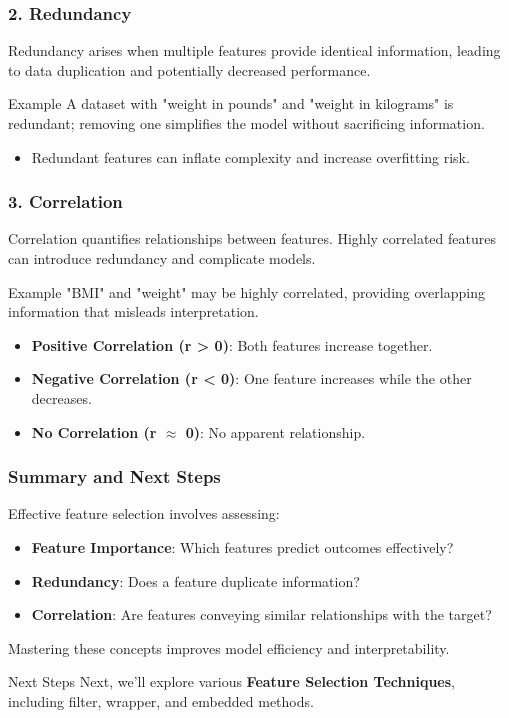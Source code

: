 \documentclass{beamer}
\begin{document}
\begin{frame}[fragile]
    \frametitle{2. Redundancy}
    Redundancy arises when multiple features provide identical information, leading to data duplication and potentially decreased performance.

    \begin{block}{Example}
        A dataset with "weight in pounds" and "weight in kilograms" is redundant; removing one simplifies the model without sacrificing information.
    \end{block}

    \begin{itemize}
        \item Redundant features can inflate complexity and increase overfitting risk.
    \end{itemize}
\end{frame}

\begin{frame}[fragile]
    \frametitle{3. Correlation}
    Correlation quantifies relationships between features. Highly correlated features can introduce redundancy and complicate models.

    \begin{block}{Example}
        "BMI" and "weight" may be highly correlated, providing overlapping information that misleads interpretation.
    \end{block}

    \begin{itemize}
        \item \textbf{Positive Correlation (r > 0)}: Both features increase together.
        \item \textbf{Negative Correlation (r < 0)}: One feature increases while the other decreases.
        \item \textbf{No Correlation (r $\approx$ 0)}: No apparent relationship.
    \end{itemize}
\end{frame}

\begin{frame}[fragile]
    \frametitle{Summary and Next Steps}
    Effective feature selection involves assessing:
    \begin{itemize}
        \item \textbf{Feature Importance}: Which features predict outcomes effectively?
        \item \textbf{Redundancy}: Does a feature duplicate information?
        \item \textbf{Correlation}: Are features conveying similar relationships with the target?
    \end{itemize}

    Mastering these concepts improves model efficiency and interpretability.

    \begin{block}{Next Steps}
        Next, we’ll explore various \textbf{Feature Selection Techniques}, including filter, wrapper, and embedded methods.
    \end{block}
\end{frame}
\end{document}
